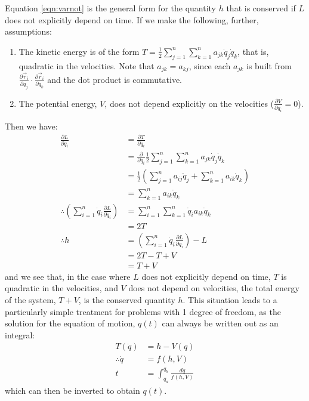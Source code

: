 Equation \ref{eqn:varnot} is the general form for the quantity $h$ that is conserved if $L$ does not explicitly depend on time. If we make the following, further, assumptions:
\begin{enumerate}
\item The kinetic energy is of the form $T=\frac{1}{2}\sum_{j=1}^n\sum_{k=1}^na_{jk}\dot{q}_j\dot{q}_k$, that is, quadratic in the velocities. Note that $a_{jk}=a_{kj}$, since each $a_{jk}$ is built from $\frac{\partial\vec{r}_i}{\partial q_j}\cdot\frac{\partial\vec{r}_i}{\partial q_k}$ and the dot product is commutative.
\item The potential energy, $V$, does not depend explicitly on the velocities ($\frac{\partial V}{\partial\dot{q}_i}=0$).
\end{enumerate}
Then we have:
\begin{align}
\frac{\partial L}{\partial\dot{q}_i}&=\frac{\partial T}{\partial\dot{q}_i}\nonumber\\
&=\frac{\partial }{\partial\dot{q}_i}\frac{1}{2}\sum_{j=1}^n\sum_{k=1}^na_{jk}\dot{q}_j\dot{q}_k\nonumber\\
&=\frac{1}{2}\left(\sum_{j=1}^n a_{ij}\dot{q}_j+\sum_{k=1}^n a_{ik}\dot{q}_k\right)\nonumber\\
&=\sum_{k=1}^na_{ik}\dot{q}_k\nonumber\\
\therefore \left(\sum_{i=1}^n \dot{q}_i\frac{\partial L}{\partial \dot{q}_i}\right) &= \sum_{i=1}^n\sum_{k=1}^n\dot{q}_ia_{ik}\dot{q}_k\nonumber\\
&=2T\nonumber\\
\therefore h&=\left(\sum_{i=1}^n \dot{q}_i\frac{\partial L}{\partial \dot{q}_i}\right)-L\nonumber\\
&=2T - T +V\nonumber\\
&=T+V
\end{align}
and we see that, in the case where $L$ does not explicitly depend on time, $T$ is quadratic in the velocities, and $V$ does not depend on velocities, the total energy of the system, $T+V$, is the conserved quantity $h$. This situation leads to a particularly simple treatment for problems with 1 degree of freedom, as the solution for the equation of motion, $q(t)$ can always be written out as an integral:
\begin{align}
T(\dot{q})&=h-V(q)\nonumber\\
\therefore \dot{q}&=f(h,V)\nonumber\\
t &=\int_{q_a}^{q_b}\frac{dq}{f(h,V)}
\label{eqn:econs1d}
\end{align} 
which can then be inverted to obtain $q(t)$.
